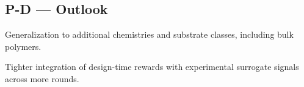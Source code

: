 \subsection*{P-D --- Outlook}
\begin{planlist}
  \item Generalization to additional chemistries and substrate classes,
        including bulk polymers.
  \item Tighter integration of design-time rewards with experimental surrogate
        signals across more rounds.
\end{planlist}
